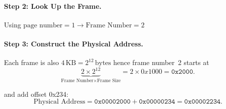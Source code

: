 \documentclass{article}
\begin{document}
\paragraph{Step 2: Look Up the Frame.}

Using \(\text{page number} = 1 \longrightarrow \text{Frame Number} = 2\)


\paragraph{Step 3: Construct the Physical Address.}

Each frame is also \(4\,\text{KB} = 2^{12}\,\text{bytes}\) hence frame number~2 starts at
\[
\underbrace{2 \times 2^{12}}_{\text{Frame Number} \times \text{Frame Size}}
= 2 \times 0x1000 
= \texttt{0x2000}.
\]

and add offset 0x234:
\[
\text{Physical Address} = \texttt{0x00002000} + \texttt{0x00000234} = \texttt{0x00002234}.
\]



\newpage


\end{document}

